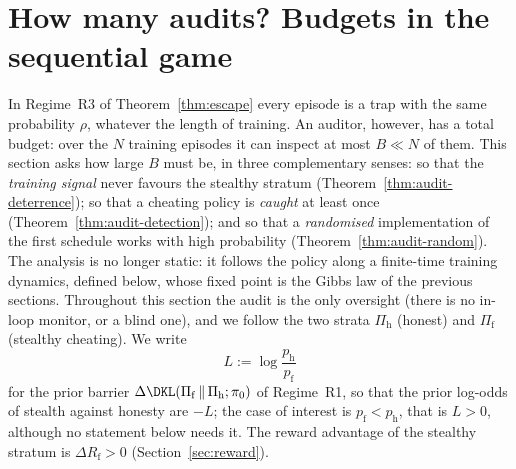 \section{How many audits? Budgets in the sequential game}
\label{sec:audit-budget}

In Regime~R3 of Theorem~\ref{thm:escape} every episode is a trap with the
same probability $\rho$, whatever the length of training. An auditor,
however, has a total budget: over the $N$ training episodes it can inspect at
most $B\ll N$ of them. This section asks how large $B$ must be, in three
complementary senses: so that the \emph{training signal} never favours the
stealthy stratum (Theorem~\ref{thm:audit-deterrence}); so that a cheating
policy is \emph{caught} at least once (Theorem~\ref{thm:audit-detection}); and
so that a \emph{randomised} implementation of the first schedule works with
high probability (Theorem~\ref{thm:audit-random}). The analysis is no longer
static: it follows the policy along a finite-time training dynamics, defined
below, whose fixed point is the Gibbs law of the previous sections. Throughout
this section the audit is the only oversight (there is no in-loop monitor, or
a blind one), and we follow the two strata $\Pi_{\mathrm h}$ (honest) and
$\Pi_{\mathrm f}$ (stealthy cheating). We write
\[
  L:=\log\frac{p_{\mathrm h}}{p_{\mathrm f}}
\]
for the prior barrier
$\Delta\DKL(\Pi_{\mathrm f}\,\|\,\Pi_{\mathrm h};\pi_0)$ of Regime~R1, so that
the prior log-odds of stealth against honesty are $-L$; the case of interest
is $p_{\mathrm f}<p_{\mathrm h}$, that is $L>0$, although no statement below
needs it. The reward advantage of the stealthy stratum is
$\Delta R_{\mathrm f}>0$ (Section~\ref{sec:reward}).

